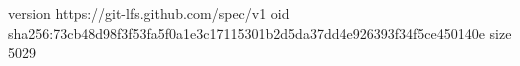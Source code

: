 version https://git-lfs.github.com/spec/v1
oid sha256:73cb48d98f3f53fa5f0a1e3c17115301b2d5da37dd4e926393f34f5ce450140e
size 5029
